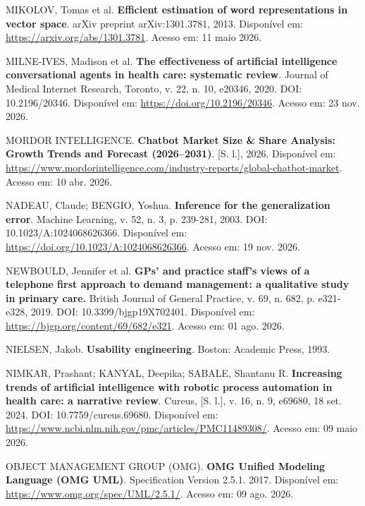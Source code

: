 \documentclass[12pt,a4paper]{extarticle}
\begin{document}
\vspace{0.5cm}\noindent
MIKOLOV, Tomas et al. \textbf{Efficient estimation of word representations in vector space}. arXiv preprint arXiv:1301.3781, 2013. Disponível em: \url{https://arxiv.org/abs/1301.3781}. Acesso em: 11 maio 2026.

\vspace{0.5cm}\noindent
MILNE-IVES, Madison et al. \textbf{The effectiveness of artificial intelligence conversational agents in health care: systematic review}. Journal of Medical Internet Research, Toronto, v. 22, n. 10, e20346, 2020. DOI: 10.2196/20346. Disponível em: \url{https://doi.org/10.2196/20346}. Acesso em: 23 nov. 2026.

\vspace{0.5cm}\noindent
MORDOR INTELLIGENCE. \textbf{Chatbot Market Size \& Share Analysis: Growth Trends and Forecast (2026--2031)}. [S. l.], 2026. Disponível em: \url{https://www.mordorintelligence.com/industry-reports/global-chatbot-market}. Acesso em: 10 abr. 2026.

\vspace{0.5cm}\noindent
NADEAU, Claude; BENGIO, Yoshua. \textbf{Inference for the generalization error}. Machine Learning, v. 52, n. 3, p. 239-281, 2003. DOI: 10.1023/A:1024068626366. Disponível em: \url{https://doi.org/10.1023/A:1024068626366}. Acesso em: 19 nov. 2026.

\vspace{0.5cm}\noindent
NEWBOULD, Jennifer et al. \textbf{GPs' and practice staff's views of a telephone first approach to demand management: a qualitative study in primary care.} British Journal of General Practice, v. 69, n. 682, p. e321-e328, 2019. DOI: 10.3399/bjgp19X702401. Disponível em: \url{https://bjgp.org/content/69/682/e321}. Acesso em: 01 ago. 2026.

\vspace{0.5cm}\noindent
NIELSEN, Jakob. \textbf{Usability engineering}. Boston: Academic Press, 1993.

\vspace{0.5cm}\noindent
NIMKAR, Prashant; KANYAL, Deepika; SABALE, Shantanu R. \textbf{Increasing trends of artificial intelligence with robotic process automation in health care: a narrative review}. Cureus, [S. l.], v. 16, n. 9, e69680, 18 set. 2024. DOI: 10.7759/cureus.69680. Disponível em: \url{https://www.ncbi.nlm.nih.gov/pmc/articles/PMC11489308/}. Acesso em: 09 maio 2026.

\vspace{0.5cm}\noindent
OBJECT MANAGEMENT GROUP (OMG). \textbf{OMG Unified Modeling Language (OMG UML)}. Specification Version 2.5.1. 2017. Disponível em: \url{https://www.omg.org/spec/UML/2.5.1/}. Acesso em: 09 ago. 2026.
\end{document}
